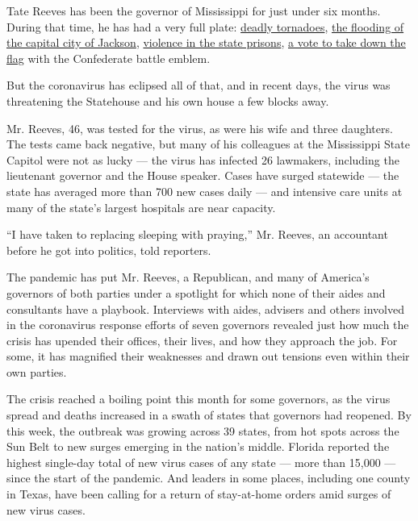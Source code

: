 Tate Reeves has been the governor of Mississippi for just under six
months. During that time, he has had a very full plate:
\href{https://www.nytimes.com/2020/04/13/us/tornado-storm-south.html}{deadly
tornadoes},
\href{https://www.nytimes.com/2020/02/16/us/mississippi-flood-jackson.html}{the
flooding of the capital city of Jackson},
\href{https://www.nytimes.com/2020/01/09/us/mississippi-prisons.html}{violence
in the state prisons},
\href{https://www.nytimes.com/2020/07/10/us/mississippi-confederate-flag.html}{a
vote to take down the flag} with the Confederate battle emblem.

But the coronavirus has eclipsed all of that, and in recent days, the
virus was threatening the Statehouse and his own house a few blocks
away.

Mr. Reeves, 46, was tested for the virus, as were his wife and three
daughters. The tests came back negative, but many of his colleagues at
the Mississippi State Capitol were not as lucky --- the virus has
infected 26 lawmakers, including the lieutenant governor and the House
speaker. Cases have surged statewide --- the state has averaged more
than 700 new cases daily --- and intensive care units at many of the
state's largest hospitals are near capacity.

``I have taken to replacing sleeping with praying,'' Mr. Reeves, an
accountant before he got into politics, told reporters.

The pandemic has put Mr. Reeves, a Republican, and many of America's
governors of both parties under a spotlight for which none of their
aides and consultants have a playbook. Interviews with aides, advisers
and others involved in the coronavirus response efforts of seven
governors revealed just how much the crisis has upended their offices,
their lives, and how they approach the job. For some, it has magnified
their weaknesses and drawn out tensions even within their own parties.

The crisis reached a boiling point this month for some governors, as the
virus spread and deaths increased in a swath of states that governors
had reopened. By this week, the outbreak was growing across 39 states,
from hot spots across the Sun Belt to new surges emerging in the
nation's middle. Florida reported the highest single-day total of new
virus cases of any state --- more than 15,000 --- since the start of the
pandemic. And leaders in some places, including one county in Texas,
have been calling for a return of stay-at-home orders amid surges of new
virus cases.


